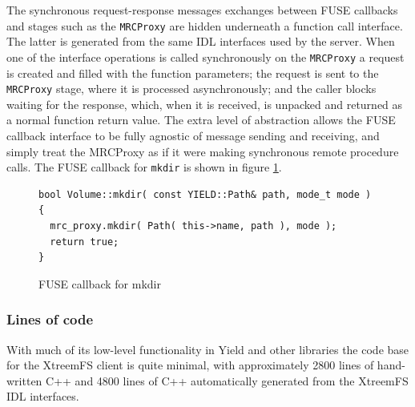 The synchronous request-response messages exchanges between FUSE callbacks and stages such as the \texttt{MRCProxy} are hidden underneath a function call interface. The latter is generated from the same IDL interfaces used by the server. When one of the interface operations is called synchronously on the \texttt{MRCProxy} a request is created and filled with the function parameters; the request is sent to the \texttt{MRCProxy} stage, where it is processed asynchronously; and the caller blocks waiting for the response, which, when it is received, is unpacked and returned as a normal function return value. The extra level of abstraction allows the FUSE callback interface to be fully agnostic of message sending and receiving, and simply treat the MRCProxy as if it were making synchronous remote procedure calls. The FUSE callback for \texttt{mkdir} is shown in figure \ref{xtreemfs_client/figures/xtreemfs_client_mkdir_code}.

\begin{figure}[h!]
\begin{verbatim}
bool Volume::mkdir( const YIELD::Path& path, mode_t mode )
{
  mrc_proxy.mkdir( Path( this->name, path ), mode );
  return true;
}
\end{verbatim}
\caption{FUSE callback for mkdir}
\label{xtreemfs_client/figures/xtreemfs_client_mkdir_code}
\end{figure}

\subsubsection{Lines of code}

With much of its low-level functionality in Yield and other libraries the code base for the XtreemFS client is quite minimal, with approximately 2800 lines of hand-written C++ and 4800 lines of C++ automatically generated from the XtreemFS IDL interfaces.